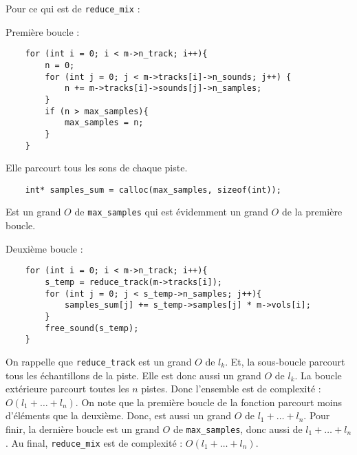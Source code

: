 \documentclass[11pt]{article} %
\begin{document}
Pour ce qui est de \texttt{reduce\_mix} :

Première boucle :

\begin{lstlisting}
    for (int i = 0; i < m->n_track; i++){
        n = 0;
        for (int j = 0; j < m->tracks[i]->n_sounds; j++) {
            n += m->tracks[i]->sounds[j]->n_samples;
        }
        if (n > max_samples){
            max_samples = n;
        }
    }
\end{lstlisting}

Elle parcourt tous les sons de chaque piste.

\begin{lstlisting}
    int* samples_sum = calloc(max_samples, sizeof(int));
\end{lstlisting}

Est un grand $O$ de \texttt{max\_samples} qui est évidemment un grand $O$ de la première boucle.

Deuxième boucle :

\begin{lstlisting}
    for (int i = 0; i < m->n_track; i++){
        s_temp = reduce_track(m->tracks[i]);
        for (int j = 0; j < s_temp->n_samples; j++){
            samples_sum[j] += s_temp->samples[j] * m->vols[i];
        }
        free_sound(s_temp);
    }
\end{lstlisting}

On rappelle que \texttt{reduce\_track} est un grand $O$ de $l_k$. Et, la sous-boucle parcourt tous les échantillons de la piste. Elle est donc aussi un grand $O$ de $l_k$. La boucle extérieure parcourt toutes les $n$ pistes. Donc l'ensemble est de complexité : $O(l_1 + \ldots + l_n)$. On note que la première boucle de la fonction parcourt moins d'éléments que la deuxième. Donc, est aussi un grand $O$ de $l_1 + \ldots + l_n$. Pour finir, la dernière boucle est un grand $O$ de \texttt{max\_samples}, donc aussi de $l_1 + \ldots + l_n$. Au final, \texttt{reduce\_mix} est de complexité : $O(l_1 + \ldots + l_n)$.
\end{document}
